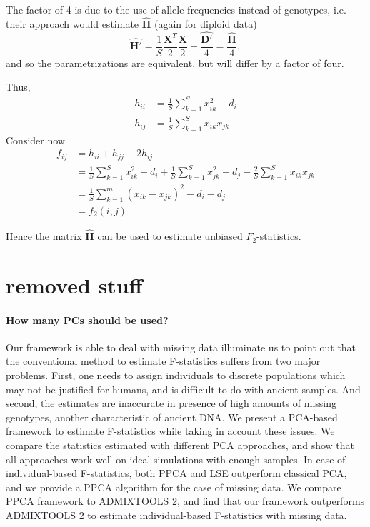 \documentclass[12pt, letterpaper]{article}
\begin{document}
The factor of 4 is due to the use of allele frequencies instead of genotypes, i.e. their approach would estimate $\hat{\mathbf{H}}$ (again for diploid data)
\begin{equation*}
    \hat{\mathbf{H}'} = \frac{1}{S}\frac{\mathbf{X}^T}{2}\frac{\mathbf{X}}{2} - \frac{\hat{\mathbf{D'}}}{4} = \frac{\hat{\mathbf{H}}}{4},
\end{equation*}
and so the parametrizations are equivalent, but will differ by a factor of four.

Thus, 
\begin{subequations}\begin{align}
    h_{ii} &= \frac{1}{S}\sum_{k=1}^S x_{ik}^2 - d_i \\
    h_{ij} &= \frac{1}{S}\sum_{k=1}^S x_{ik}x_{jk} 
\end{align}\end{subequations}
Consider now
\begin{align}
    f_{ij} &= h_{ii} + h_{jj} - 2 h_{ij}\nonumber\\
     &= \frac{1}{S}\sum_{k=1}^S x_{ik}^2 - d_i + \frac{1}{S}\sum_{k=1}^S x_{jk}^2 - d_j - \frac{2}{S}\sum_{k=1}^S x_{ik}x_{jk}\nonumber \\
    &= \frac{1}{S} \sum_{k=1}^m (x_{ik} - x_{jk})^2 - d_i - d_j \\
    &= f_2(i,j)\nonumber
\end{align}

Hence the matrix $\hat{\mathbf{H}}$ can be used to estimate unbiased $F_2$-statistics.



\section{removed stuff}



\paragraph{How many PCs should be used?}
Our framework is able to deal with missing data illuminate us to point out that the conventional method to estimate F-statistics suffers from two major problems. First, one needs to assign individuals to discrete populations which may not be justified for humans, and is difficult to do with ancient samples. And second, the estimates are inaccurate in presence of high amounts of missing genotypes, another characteristic of ancient DNA. We present a PCA-based framework to estimate F-statistics while taking in account these issues. We compare the statistics estimated with different PCA approaches, and show that all approaches work well on ideal simulations with enough samples. In case of individual-based F-statistics, both PPCA and LSE outperform classical PCA, and we provide a PPCA algorithm for the case of missing data. We compare PPCA framework to ADMIXTOOLS 2, and find that our framework outperforms ADMIXTOOLS 2 to estimate individual-based F-statistics with missing data.
\end{document}
